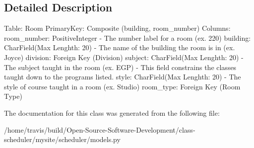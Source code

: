 \subsection{Detailed Description}
\begin{DoxyVerb}    Table: Room
    PrimaryKey: Composite (building, room_number)
    Columns: 
        room_number: PositiveInteger
            - The number label for a room (ex. 220)
        building: CharField(Max Lenghth: 20)
            - The name of the building the room is in (ex. Joyce)
        division: Foreign Key (Division)
        subject: CharField(Max Lenghth: 20)
            - The subject taught in the room (ex. EGP)
            - This field constrains the classes taught down to the programs listed.
        style: CharField(Max Lenghth: 20)
            - The style of course taught in a room (ex. Studio)
        room_type: Foreign Key (Room Type)
\end{DoxyVerb}
 

The documentation for this class was generated from the following file\-:\begin{DoxyCompactItemize}
\item 
/home/travis/build/\-Open-\/\-Source-\/\-Software-\/\-Development/class-\/scheduler/mysite/scheduler/models.\-py\end{DoxyCompactItemize}
